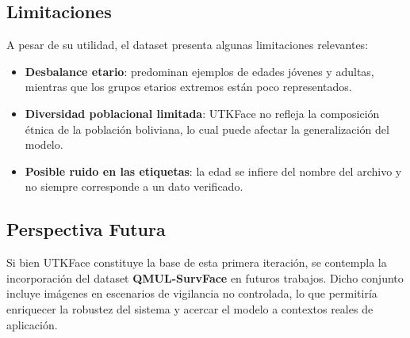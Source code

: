\subsection{Limitaciones}
A pesar de su utilidad, el dataset presenta algunas limitaciones relevantes:

\begin{itemize}
  \item \textbf{Desbalance etario}: predominan ejemplos de edades jóvenes y adultas, mientras que los grupos etarios extremos están poco representados.
  \item \textbf{Diversidad poblacional limitada}: UTKFace no refleja la composición étnica de la población boliviana, lo cual puede afectar la generalización del modelo.
  \item \textbf{Posible ruido en las etiquetas}: la edad se infiere del nombre del archivo y no siempre corresponde a un dato verificado.
\end{itemize}

\subsection{Perspectiva Futura}
Si bien UTKFace constituye la base de esta primera iteración, 
se contempla la incorporación del dataset \textbf{QMUL-SurvFace} en futuros trabajos. 
Dicho conjunto incluye imágenes en escenarios de vigilancia no controlada, lo que permitiría enriquecer 
la robustez del sistema y acercar el modelo a contextos reales de aplicación.
